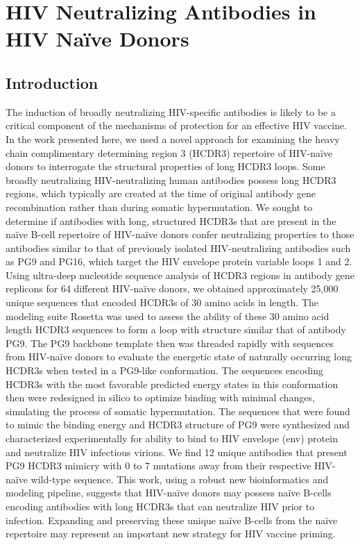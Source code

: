 \chapter{HIV Neutralizing Antibodies in HIV Na\"{i}ve Donors}
\section{Introduction}
The induction of broadly neutralizing HIV-specific antibodies is likely to be a critical component of the mechanisms of protection for an effective HIV vaccine. In the work presented here, we used a novel approach for examining the heavy chain complimentary determining region 3 (HCDR3) repertoire of HIV-naïve donors to interrogate the structural properties of long HCDR3 loops. Some broadly neutralizing HIV-neutralizing human antibodies possess long HCDR3 regions, which typically are created at the time of original antibody gene recombination rather than during somatic hypermutation. We sought to determine if antibodies with long, structured HCDR3s that are present in the naïve B-cell repertoire of HIV-naïve donors confer neutralizing properties to those antibodies similar to that of previously isolated HIV-neutralizing antibodies such as PG9 and PG16, which target the HIV envelope protein variable loops 1 and 2. Using ultra-deep nucleotide sequence analysis of HCDR3 regions in antibody gene replicons for 64 different HIV-naïve donors, we obtained approximately 25,000 unique sequences that encoded HCDR3s of 30 amino acids in length. The modeling suite Rosetta was used to assess the ability of these 30 amino acid length HCDR3 sequences to form a loop with structure similar that of antibody PG9. The PG9 backbone template then was threaded rapidly with sequences from HIV-naïve donors to evaluate the energetic state of naturally occurring long HCDR3s when tested in a PG9-like conformation. The sequences encoding HCDR3s with the most favorable predicted energy states in this conformation then were redesigned in silico to optimize binding with minimal changes, simulating the process of somatic hypermutation. The sequences that were found to mimic the binding energy and HCDR3 structure of PG9 were synthesized and characterized experimentally for ability to bind to HIV envelope (env) protein and neutralize HIV infectious virions. We find 12 unique antibodies that present PG9 HCDR3 mimicry with 0 to 7 mutations away from their respective HIV-naïve wild-type sequence. This work, using a robust new bioinformatics and modeling pipeline, suggests that HIV-naïve donors may possess naïve B-cells encoding antibodies with long HCDR3s that can neutralize HIV prior to infection. Expanding and preserving these unique naïve B-cells from the naïve repertoire may represent an important new strategy for HIV vaccine priming.

